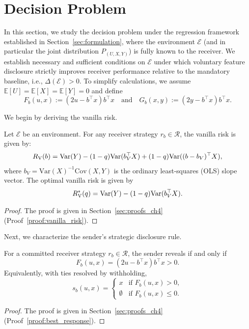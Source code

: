\section{Decision Problem}

In this section, we study the decision problem under the regression framework established in Section~\ref{sec:formulation}, where the environment $\mathcal{E}$ (and in particular the joint distribution $P_{(U,X,Y)}$) is fully known to the receiver. We establish necessary and sufficient conditions on $\mathcal{E}$ under which voluntary feature disclosure strictly improves receiver performance relative to the mandatory baseline, i.e., $\Delta(\mathcal{E})>0$. To simplify calculations, we assume $\mathbb{E}[U]=\mathbb{E}[X]=\mathbb{E}[Y]=0$ and define
\begin{equation*}
    F_b(u,x):= (2u - b^\top x)b^\top x \quad \text{and} \quad G_b(x,y):= (2y - b^\top x)b^\top x.
\end{equation*}

We begin by deriving the vanilla risk.
\begin{lemma}\label{lemma:regression_vanilla_risk}
Let $\mathcal{E}$ be an environment. For any receiver strategy $r_b \in \mathcal{R}$, the vanilla risk is given by:
\begin{equation}
    \label{eq:vanilla_risk_decomp}
    R_{\mathrm{V}}(b) = \mathrm{Var}(Y) - (1 - q)\mathrm{Var}(b_V^\top X) + (1 - q)\mathrm{Var}((b - b_V)^\top X),
\end{equation} 
where $b_V = \mathrm{Var}(X)^{-1}\mathrm{Cov}(X, Y)$ is the ordinary least-squares (OLS) slope vector. The optimal vanilla risk is given by
\begin{equation*}
    R_{\mathrm{V}}^*(q) = \mathrm{Var}(Y) - (1 - q)\mathrm{Var}(b_V^\top X).
\end{equation*}
\end{lemma} 
\begin{proof} The proof is given in Section~\ref{sec:proofs_ch4} (Proof~\ref{proof:vanilla_risk}).
\end{proof}

Next, we characterize the sender's strategic disclosure rule.
\begin{lemma}
\label{lem:best_response}
For a committed receiver strategy $r_b \in \mathcal{R}$, the sender reveals if and only if
\begin{equation*}
    F_b(u, x) = (2u - b^\top x)b^\top x > 0.
\end{equation*}
Equivalently, with ties resolved by withholding,
\begin{equation*}
    s_b(u,x) = 
    \begin{cases} 
    x & \text{if } F_b(u,x) > 0, \\ 
    \emptyset & \text{if } F_b(u,x) \le 0. 
    \end{cases}
\end{equation*}
\end{lemma}
\begin{proof} The proof is given in Section~\ref{sec:proofs_ch4} (Proof~\ref{proof:best_response}).
\end{proof}

